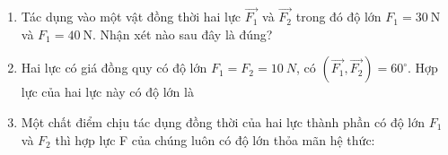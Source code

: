 \begin{enumerate}[label=\bfseries Câu \arabic*:,leftmargin=1.5cm]
{		Một chất điểm đứng yên dưới tác dụng của $3$ lực có độ lớn bằng nhau thì ba lực có giá cùng nằm trong 1 mặt phẳng, chúng lần lượt hợp với nhau những góc $120^\circ$.
		
	}
	\item {}
	
	{ Tác dụng vào một vật đồng thời hai lực $\vec{F_1}$  và $\vec{F_2}$ trong đó độ lớn $F_1 = 30\ \text{N}$ và $F_1 = 40\ \text{N}$. Nhận xét nào sau đây là đúng?
	}
	
	
	
	\item {}
	
	{ Hai lực có giá đồng quy có độ lớn $F_1=F_2=10\ N$, có $(\overrightarrow {F_1}, \overrightarrow {F_2})=60^\circ$. Hợp lực của hai lực này có độ lớn là
		
	}
	\item {}
	
	{ Một chất điểm chịu tác dụng đồng thời của hai lực thành phần có độ lớn $F_1$ và $F_2$ thì hợp lực F của chúng luôn có độ lớn thỏa mãn hệ thức:
		
}
\end{enumerate}
